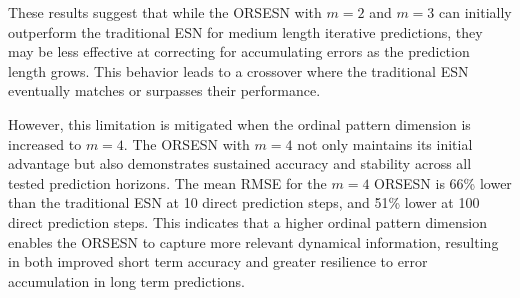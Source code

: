 These results suggest that while the ORSESN with $m=2$ and $m=3$ can initially outperform the traditional ESN for medium length iterative predictions, they may be less effective at correcting for accumulating errors as the prediction length grows. This behavior leads to a crossover where the traditional ESN eventually matches or surpasses their performance.

However, this limitation is mitigated when the ordinal pattern dimension is increased to $m=4$. The ORSESN with $m=4$ not only maintains its initial advantage but also demonstrates sustained accuracy and stability across all tested prediction horizons. The mean RMSE for the $m=4$ ORSESN is 66\% lower than the traditional ESN at 10 direct prediction steps, and 51\% lower at 100 direct prediction steps. This indicates that a higher ordinal pattern dimension enables the ORSESN to capture more relevant dynamical information, resulting in both improved short term accuracy and greater resilience to error accumulation in long term predictions.




